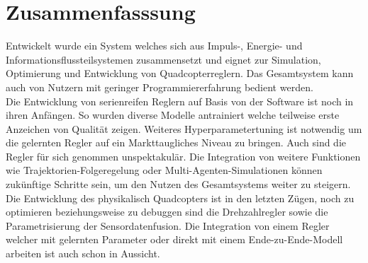 \section{Zusammenfasssung}
Entwickelt wurde ein System welches sich aus Impuls-, Energie- und Informationsflussteilsystemen zusammensetzt und eignet zur Simulation, Optimierung und Entwicklung von Quadcopterreglern. Das Gesamtsystem kann auch von Nutzern mit geringer Programmiererfahrung bedient werden.\\
Die Entwicklung von serienreifen Reglern auf Basis von der Software ist noch in ihren Anfängen. So wurden diverse Modelle antrainiert welche teilweise erste Anzeichen von Qualität zeigen. Weiteres Hyperparametertuning ist notwendig um die gelernten Regler auf ein Markttaugliches Niveau zu bringen. Auch sind die Regler für sich genommen unspektakulär. Die Integration von weitere Funktionen wie Trajektorien-Folgeregelung oder Multi-Agenten-Simulationen können zukünftige Schritte sein, um den Nutzen des Gesamtsystems weiter zu steigern.\\
Die Entwicklung des physikalisch Quadcopters ist in den letzten Zügen, noch zu optimieren beziehungsweise zu debuggen sind die Drehzahlregler sowie die Parametrisierung der Sensordatenfusion. Die Integration von einem Regler welcher mit gelernten Parameter oder direkt mit einem Ende-zu-Ende-Modell arbeiten ist auch schon in Aussicht.